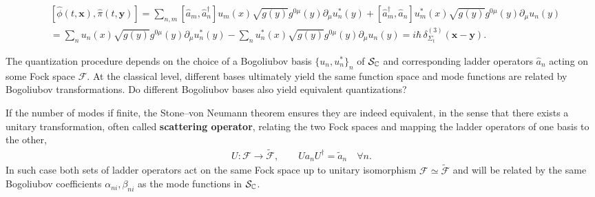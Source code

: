 \documentclass[../QFT_main.tex]{subfiles}
\begin{document}
\begin{mytheorem}
\begin{align}
    &[\hat{\phi}(t,\mathbf{x}), \hat{\pi}(t,\mathbf{y})] = \sum_{n,m} [\hat{a}_m, \hat{a}_n^\dagger] u_m(x) \sqrt{g(y)} g^{0\mu}(y)\partial_\mu u_n^*(y) + [\hat{a}_m^\dagger, \hat{a}_n] u_m^*(x) \sqrt{g(y)} g^{0\mu}(y)\partial_\mu u_n(y)\\
    &= \sum_{n} u_n(x) \sqrt{g(y)} g^{0\mu}(y)\partial_\mu u_n^*(y) - \sum_{n} u_n^*(x) \sqrt{g(y)} g^{0\mu}(y)\partial_\mu u_n(y) = i\hbar\, \delta^{(3)}_{\Sigma_t}(\mathbf{x}-\mathbf{y}).
\end{align}
\end{mytheorem}



\begin{mytheorem}
%
The quantization procedure depends on the choice of a Bogoliubov basis $\{u_n, u_n^*\}_n$ of $\mathcal{S}_{\mathbb{C}}$ and corresponding ladder operators $\hat{a}_n$ acting on some Fock space $\mathcal{F}$.
At the classical level, different bases ultimately yield the same function space and mode functions are related by Bogoliubov transformations.
Do different Bogoliubov bases also yield equivalent quantizations?

If the number of modes if finite, the Stone--von Neumann theorem ensures they are indeed equivalent, in the sense that there exists a unitary transformation, often called \textbf{scattering operator}, relating the two Fock spaces and mapping the ladder operators of one basis to the other,
\begin{align}
    U:\mathcal{F} \to \tilde{\mathcal{F}},\qquad
    U a_n U^\dagger = \tilde{a}_n \quad \forall n.
\end{align}
In such case both sets of ladder operators act on the same Fock space up to unitary isomorphism $\mathcal{F}\simeq \tilde{\mathcal{F}}$ and will be related by the same Bogoliubov coefficients $\alpha_{ni}, \beta_{ni}$ as the mode functions in $\mathcal{S}_{\mathbb{C}}$.


\end{mytheorem}
\end{document}
